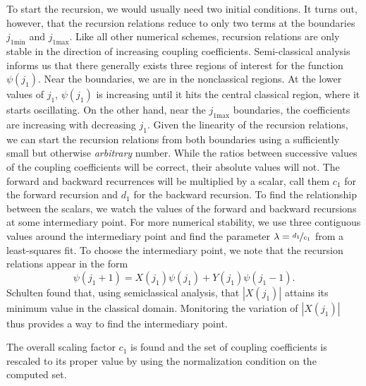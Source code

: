 To start the recursion, we would usually need two initial
conditions. It turns out, however, that the recursion
relations reduce to only two terms at the boundaries
$j_{1\text{min}}$ and $j_{1\text{max}}$. Like all
other numerical schemes, recursion relations
are only stable in the direction of increasing
coupling coefficients. Semi-classical analysis
\cite{SCH1975} informs us that there generally exists
three regions of interest for the function $\psi(j_1)$.
Near the boundaries, we are in the nonclassical 
regions. At the lower values of $j_1$, $\psi(j_1)$
is increasing until it hits the central classical
region, where it starts oscillating. On the other
hand, near the $j_{1\text{max}}$ boundaries, the
coefficients are increasing with decreasing $j_1$. 
Given the linearity of the recursion relations, we
can start the recursion relations from both boundaries
using a sufficiently small but otherwise \textit{arbitrary} number. 
While the ratios between successive values of the coupling coefficients
will be correct, their absolute values will not. The forward and backward
recurrences will be multiplied by a scalar, call them $c_1$ for the forward
recursion and $d_1$ for the backward recursion. To find the relationship
between the scalars, we watch the values of the forward and backward
recursions at some intermediary point. For more numerical stability, 
we use three contiguous values around the intermediary point
and find the parameter $\lambda=\nicefrac{d_1}{c_1}$ from a least-squares fit.
To choose the intermediary point, we note that the recursion relations
appear in the form
  \begin{equation}
   \psi(j_1+1)=X(j_1)\psi(j_1)+Y(j_1)\psi(j_1-1).
  \end{equation}
Schulten found that, using semiclassical analysis, 
that $|X(j_1)|$ attains its minimum value 
in the classical domain. Monitoring the variation
of $|X(j_1)|$ thus provides a way to find the intermediary point.

The overall scaling factor $c_1$ is found and the set of 
coupling coefficients is rescaled to its proper value
by using the normalization condition on the computed set.

